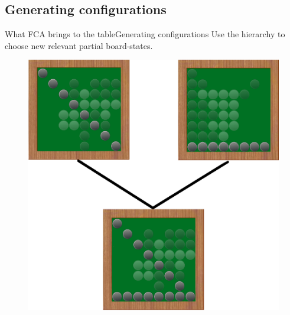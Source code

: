 \subsection{Generating configurations}
\begin{frame}{What FCA brings to the table}{Generating configurations}
\vspace{0.05\paperheight}
Use the hierarchy to choose new relevant partial board-states.
\vspace{0.02\paperheight}
\begin{figure}[ht]
  \includegraphics[height=0.60\paperheight]{img/fca/fca_new_configuration}
\end{figure}

\end{frame}